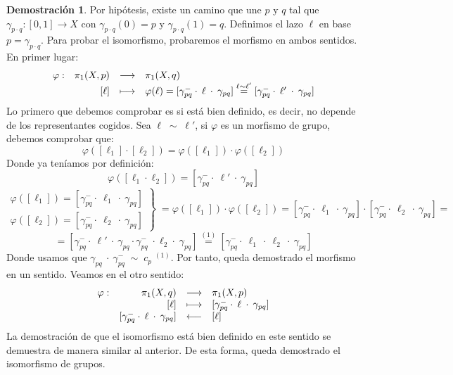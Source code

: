 \documentclass[12pt,twoside]{report}
\theoremstyle{azul}
\theoremstyle{azul2}
\theoremstyle{plain}
\theoremstyle{definition}
\newtheorem*{dem}{Demostración}
\theoremstyle{remark}
\begin{document}
\begin{dem}
Por hipótesis, existe un camino que une $p$ y $q$ tal que $\gamma_{p \cdot q}: [0,1] \longrightarrow X$ con $\gamma_{p \cdot q}(0)=p$ y $\gamma_{p \cdot q}(1)=q$. Definimos el lazo $\ell$ en base $p=\gamma_{p \cdot q}$. Para probar el isomorfismo, probaremos el morfismo en ambos sentidos. En primer lugar:
$$\begin{array}{rrcl}
     \varphi : & \mathlarger{\pi}_1(X,p) & \longrightarrow & \mathlarger{\pi}_1(X,q) \\
     \; & [\ell] & \longmapsto & \varphi(\ell) = [\gamma_{p q}^- \cdot \: \ell \: \cdot \: \gamma_{p q}] \stackrel{\ell \sim \ell'}{=} [\gamma_{p q}^- \cdot \: \ell' \: \cdot \: \gamma_{p q}]  
\end{array}$$
Lo primero que debemos comprobar es si está bien definido, es decir, no depende de los representantes cogidos. Sea $\ell \; \sim \; \ell'$, si $\varphi$ es un morfismo de grupo, debemos comprobar que:
$$\varphi([\ell_1] \cdot [\ell_2])=\varphi([\ell_1]) \cdot \varphi([\ell_2])$$
Donde ya teníamos por definición:
$$\varphi([\ell_1 \cdot \ell_2])=[\gamma_{p q}^- \cdot \: \ell' \: \cdot \: \gamma_{p q}]$$
$$\left. \begin{array}{l}
     \varphi ([\ell_1])=[\gamma_{p q}^- \cdot \: \ell_1 \: \cdot \: \gamma_{p q}]  \\
     \varphi ([\ell_2])=[\gamma_{p q}^- \cdot \: \ell_2 \: \cdot \: \gamma_{p q}] 
\end{array} \right\} \; = \varphi([\ell_1]) \cdot \varphi([\ell_2])=[\gamma_{p q}^- \cdot \: \ell_1 \: \cdot \: \gamma_{p q}] \cdot [\gamma_{p q}^- \cdot \: \ell_2 \: \cdot \: \gamma_{p q}]=$$
$$=[\gamma_{p q}^- \cdot \: \ell' \: \cdot \: \gamma_{p q} \cdot \gamma_{p q}^- \; \cdot  \ell_2 \cdot \; \gamma_{p q}]\stackrel{(1)}{=}[\gamma_{p q}^- \cdot \: \ell_1 \: \cdot \: \ell_2 \: \cdot \: \gamma_{p q}]$$
Donde usamos que $\gamma_{pq} \: \cdot \: \gamma_{pq}^- \; \sim \; c_p \; ^{(1)}$. Por tanto, queda demostrado el morfismo en un sentido. Veamos en el otro sentido:
$$\begin{array}{rrcl}
     \varphi : & \mathlarger{\pi}_1(X,q) & \longrightarrow & \mathlarger{\pi}_1(X,p) \\
     \; & [\ell] & \longmapsto & [\gamma_{p q}^- \cdot \: \ell \: \cdot \: \gamma_{p q}]  \\
     \; & [\gamma_{p q}^- \cdot \: \ell \: \cdot \: \gamma_{p q}] & \longleftarrow & [\ell]
\end{array}$$
La demostración de que el isomorfismo está bien definido en este sentido se demuestra de manera similar al anterior. De esta forma, queda demostrado el isomorfismo de grupos. 
\end{dem}
\end{document}

